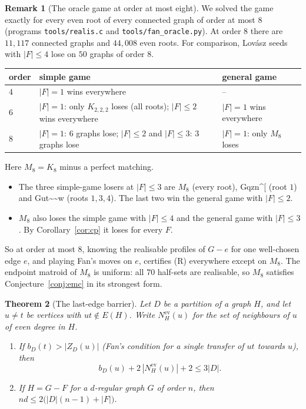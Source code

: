 \documentclass[11pt]{amsart}
\newtheorem{theorem}{Theorem}
\theoremstyle{definition}
\newtheorem{remark}[theorem]{Remark}
\begin{document}
\begin{remark}[The oracle game at order at most eight]\label{rem:oracle}
We solved the game exactly for every even root of every connected graph of order at most $8$
(programs \texttt{tools/realis.c} and \texttt{tools/fan\_oracle.py}). At order $8$ there are $11{,}117$
connected graphs and $44{,}008$ even roots. For comparison, Lov\'asz seeds with $|F|\le4$ lose on $50$
graphs of order $8$.

\begin{center}\small
\begin{tabular}{lp{}p{}}
order & simple game & general game \\ \hline
$4$ & $|F|=1$ wins everywhere & -- \\
$6$ & $|F|=1$: only $K_{2,2,2}$ loses (all roots); $|F|\le2$ wins everywhere & $|F|=1$ wins everywhere\\
$8$ & $|F|=1$: $6$ graphs lose; $|F|\le2$ and $|F|\le3$: $3$ graphs lose & $|F|=1$: only $M_8$ loses
\end{tabular}
\end{center}

Here $M_8=K_8$ minus a perfect matching.
\begin{itemize}
\item The three simple-game losers at $|F|\le3$ are $M_8$ (every root), Gqzn\textasciicircum[ (root $1$)
and Gut\textasciitilde\textasciitilde w (roots $1,3,4$). The last two win the general game with $|F|\le2$.
\item $M_8$ also loses the simple game with $|F|\le4$ and the general game with $|F|\le3$. By
Corollary~\ref{cor:cp} it loses for every $F$.
\end{itemize}
So at order at most $8$, knowing the realisable profiles of $G-e$ for one well-chosen edge $e$, and
playing Fan's moves on $e$, certifies (R) everywhere except on $M_8$. The endpoint matroid of $M_8$ is
uniform: all $70$ half-sets are realisable, so $M_8$ satisfies Conjecture~\ref{conj:emc} in its
strongest form.
\end{remark}

\begin{theorem}[The last-edge barrier]\label{thm:barrier}
Let $D$ be a partition of a graph $H$, and let $u\ne t$ be vertices with $ut\notin E(H)$. Write
$N^{\mathrm{ev}}_H(u)$ for the set of neighbours of $u$ of even degree in $H$.
\begin{enumerate}
\item If $b_D(t)>|Z_D(u)|$ (Fan's condition for a single transfer of $ut$ towards $u$), then
\[
b_D(u)+2\,|N^{\mathrm{ev}}_H(u)|+2\le 3|D|.
\]
\item If $H=G-F$ for a $d$-regular graph $G$ of order $n$, then $nd\le 2\bigl(|D|(n-1)+|F|\bigr)$.
\end{enumerate}
\end{theorem}
\end{document}
